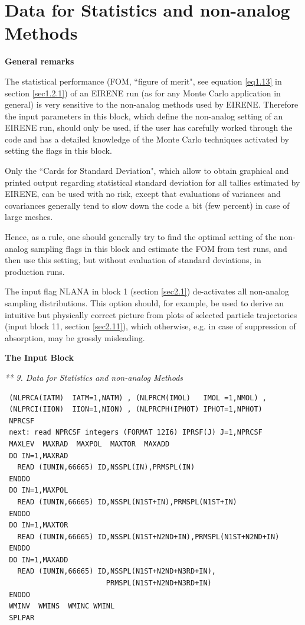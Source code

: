 \newpage
\section{Data for Statistics and non-analog Methods} \label{sec2.9}

\medskip

\noindent  %

{\bf General remarks}

\medskip

\noindent The statistical performance (FOM, ``figure of merit",
see equation \ref{eq1.13} in section \ref{sec1.2.1}) of an EIRENE
run (as for any Monte Carlo application in general) is very
sensitive to the non-analog methods used by EIRENE. Therefore the
input parameters in this block, which define the non-analog setting of an EIRENE run, should only be used, if the user
has carefully worked through the code and has a detailed knowledge
of the Monte Carlo techniques activated by setting the flags in
this block. 

Only the ``Cards for Standard Deviation", which allow to obtain graphical and printed output
regarding statistical standard deviation for all tallies estimated by EIRENE, can be used
with no risk, except that evaluations of variances and covariances
generally tend to slow down the code a bit (few percent) in case
of large meshes.

Hence, as a rule, one
should generally try to find the optimal setting of the non-analog
sampling
flags in this block and estimate the FOM from test runs,
and then use this setting, but without evaluation of standard
deviations, in production runs.

The input flag NLANA in block 1 (section \ref{sec2.1}) de-activates all non-analog sampling
distributions. This option should, for example, be used to derive an
intuitive but physically correct picture from plots of selected
particle trajectories (input block 11, section \ref{sec2.11}),
which otherwise, e.g. in case of suppression of absorption,  may be grossly misleading.
\medskip

\noindent

{\bf The Input Block}

\medskip

\noindent

{\sl*** 9. Data for Statistics and non-analog Methods}

\begin{verbatim}
 (NLPRCA(IATM)  IATM=1,NATM) , (NLPRCM(IMOL)   IMOL =1,NMOL) ,
 (NLPRCI(IION)  IION=1,NION) , (NLPRCPH(IPHOT) IPHOT=1,NPHOT)
 NPRCSF
 next: read NPRCSF integers (FORMAT 12I6) IPRSF(J) J=1,NPRCSF
 MAXLEV  MAXRAD  MAXPOL  MAXTOR  MAXADD
 DO IN=1,MAXRAD
   READ (IUNIN,66665) ID,NSSPL(IN),PRMSPL(IN)
 ENDDO
 DO IN=1,MAXPOL
   READ (IUNIN,66665) ID,NSSPL(N1ST+IN),PRMSPL(N1ST+IN)
 ENDDO
 DO IN=1,MAXTOR
   READ (IUNIN,66665) ID,NSSPL(N1ST+N2ND+IN),PRMSPL(N1ST+N2ND+IN)
 ENDDO
 DO IN=1,MAXADD
   READ (IUNIN,66665) ID,NSSPL(N1ST+N2ND+N3RD+IN),
                        PRMSPL(N1ST+N2ND+N3RD+IN)
 ENDDO
 WMINV  WMINS  WMINC WMINL
 SPLPAR
\end{verbatim}

